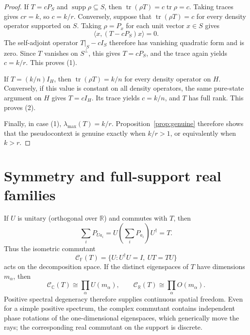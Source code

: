 \documentclass[
  twocolumn,
  aps,
  pra,
  floatfix,
  amsmath,amssymb,
  longbibliography
]{revtex4-2}
\theoremstyle{definition}
\theoremstyle{remark}
\newcommand{\R}{\mathbb R}
\newcommand{\C}{\mathbb C}
\newcommand{\F}{\mathbb F}
\newcommand{\supp}{\operatorname{supp}}
\newcommand{\Tr}{\operatorname{tr}}
\newcommand{\1}{\mathbf 1}
\begin{document}
\begin{proof}
If $T=cP_S$ and $\supp\rho\subseteq S$, then
$\Tr(\rho T)=c\Tr\rho=c$.  Taking traces gives $cr=k$, so $c=k/r$.
Conversely, suppose that $\Tr(\rho T)=c$ for every density operator supported
on $S$.  Taking $\rho=P_x$ for each unit vector $x\in S$ gives
\[
 \langle x,(T-cP_S)x\rangle=0.
\]
The self-adjoint operator $T|_S-cI_S$ therefore has vanishing quadratic form
and is zero.  Since $T$ vanishes on $S^\perp$, this gives $T=cP_S$, and the
trace again yields $c=k/r$.  This proves (1).

If $T=(k/n)I_H$, then $\Tr(\rho T)=k/n$ for every density operator on $H$.
Conversely, if this value is constant on all density operators, the same
pure-state argument on $H$ gives $T=cI_H$.  Its trace yields $c=k/n$, and
$T$ has full rank.  This proves (2).

Finally, in case (1), $\lambda_{\max}(T)=k/r$.  Proposition~\ref{prop:genuine}
therefore shows that the pseudocontext is genuine exactly when $k/r>1$, or
equivalently when $k>r$.
\end{proof}

\section{Symmetry and full-support real families}
\label{sec:symmetry}

If $U$ is unitary (orthogonal over $\R$) and commutes with $T$, then
\begin{equation}
 \sum_iP_{Ua_i}=U\left(\sum_iP_{a_i}\right)U^\dagger=T.
 \label{eq:commutant-action}
\end{equation}
Thus the isometric commutant
\begin{equation}
 \mathcal C_\F(T)=\{U:U^\dagger U=I,\ UT=TU\}
 \label{eq:commutant}
\end{equation}
acts on the decomposition space.  If the distinct eigenspaces of $T$ have
dimensions $m_\alpha$, then
\begin{equation}
 \mathcal C_\C(T)\cong\prod_\alpha U(m_\alpha),\qquad
 \mathcal C_\R(T)\cong\prod_\alpha O(m_\alpha).
 \label{eq:commutant-products}
\end{equation}
Positive spectral degeneracy therefore supplies continuous spatial freedom.
Even for a simple positive spectrum, the complex commutant contains
independent phase rotations of the one-dimensional eigenspaces, which
generically move the rays; the corresponding real commutant on the support is
discrete.
\end{document}
